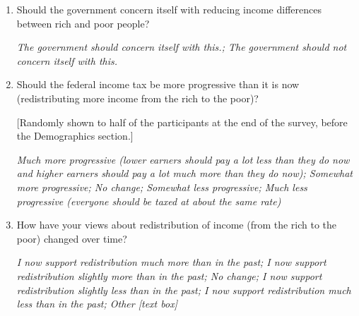 \documentclass[11pt, headsepline]{article}
\begin{document}
\begin{enumerate}[resume]


    
    \item Should the government concern itself with reducing income differences between rich and poor people?

    \textit{The government should concern itself with this.; The government should not concern itself with this.}
    
    \item Should the federal income tax be more progressive than it is now (redistributing more income from the rich to the poor)?

    [Randomly shown to half of the participants at the end of the survey, before the Demographics section.]

    \textit{Much more progressive (lower earners should pay a lot less than they do now and higher earners should pay a lot much more than they do now); Somewhat more progressive; No change; Somewhat less progressive; Much less progressive (everyone should be taxed at about the same rate)}



    \item How have your views about redistribution of income (from the rich to the poor) changed over time? 

    \textit{I now support redistribution much more than in the past; I now support redistribution slightly more than in the past; No change; I now support redistribution slightly less than in the past; I now support redistribution much less than in the past; Other [text box]}


\end{enumerate}
\end{document}
